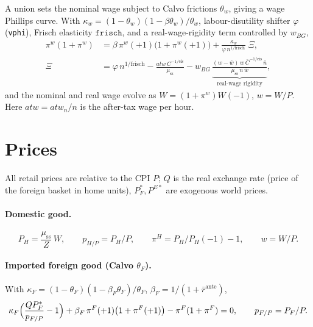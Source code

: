 \documentclass[11pt]{article}
\newcommand{\stst}{\mathrm{ss}}
\begin{document}
A union sets the nominal wage subject to Calvo frictions $\theta_w$, giving a
wage Phillips curve. With $\kappa_w=(1-\theta_w)(1-\beta\theta_w)/\theta_w$,
labour-disutility shifter $\varphi$ (\texttt{vphi}), Frisch elasticity
$\texttt{frisch}$, and a real-wage-rigidity term controlled by $w_{BG}$,
\begin{align}
\pi^{w}(1+\pi^{w})
&=\beta\,\pi^{w}(+1)\bigl(1+\pi^{w}(+1)\bigr)
+\frac{\kappa_w}{\varphi\,n^{1/\text{frisch}}}\;\Xi,\\
\Xi &= \varphi\,n^{1/\text{frisch}}
-\frac{atw\,C^{-1/\text{eis}}}{\mu_{\stst}}
- w_{BG}\,\underbrace{\frac{(w-\bar w)\,w\,\bar C^{-1/\text{eis}}\,\bar n}{\mu_{\stst}\,n\,\bar w}}_{\text{real-wage rigidity}},
\end{align}
and the nominal and real wage evolve as $W=(1+\pi^{w})W(-1)$, $w=W/P$. Here
$atw=atw_n/n$ is the after-tax wage per hour.

\section{Prices}\label{sec:prices}

All retail prices are relative to the CPI $P$; $Q$ is the real exchange rate
(price of the foreign basket in home units), $P^{*}_{F},P^{E*}$ are exogenous
world prices.

\paragraph{Domestic good.}
\begin{equation}
P_H=\frac{\mu_{\stst}}{Z}\,W,\qquad
p_{H/P}=P_H/P,\qquad
\pi^{H}=P_H/P_H(-1)-1,\qquad w=W/P.
\end{equation}

\paragraph{Imported foreign good (Calvo $\theta_F$).} With
$\kappa_F=(1-\theta_F)(1-\beta_F\theta_F)/\theta_F$, $\beta_F=1/(1+\bar r^{\text{ante}})$,
\begin{equation}
\kappa_F\Bigl(\frac{Q P^{*}_{F}}{p_{F/P}}-1\Bigr)
+\beta_F\,\pi^{F}(+1)\bigl(1+\pi^{F}(+1)\bigr)
-\pi^{F}(1+\pi^{F})=0,\qquad p_{F/P}=P_F/P .
\end{equation}
\end{document}
